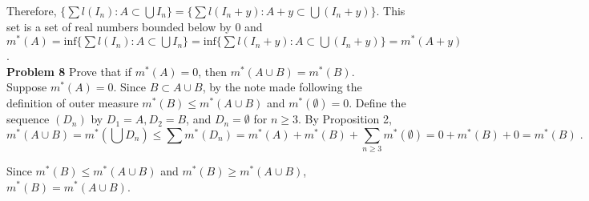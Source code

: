 \documentclass[a4paper]{article}
\begin{document}
Therefore, $\{\sum l(I_n) : A \subset \bigcup I_n \} = \{\sum l(I_n+y) : A +y\subset \bigcup (I_n+y) \}$. This set is a set of real numbers bounded below by 0 and $m^*(A) = \text{inf}\{\sum l(I_n) : A \subset \bigcup I_n \} = \text{inf}\{\sum l(I_n + y) : A \subset \bigcup (I_n+y) \} = m^*(A+y)$. \\

{\bf Problem 8} Prove that if $m^*(A) = 0$, then $m^*(A\cup B) = m^*(B)$.\\

Suppose $m^*(A) = 0$. Since $B \subset A\cup B$, by the note made following the definition of outer measure $m^*(B) \leq m^*(A\cup B)$ and $m^*(\emptyset) = 0$. Define the sequence $(D_n)$ by $D_1 = A, D_2 = B$, and $D_n = \emptyset$ for $n \geq 3$. By Proposition 2,  $$m^*(A\cup B) = m^*\left(\bigcup D_n\right) \leq \sum m^*(D_n) = m^*(A) + m^*(B) + \sum_{n\geq 3} m^*(\emptyset) = 0 + m^*(B) + 0 = m^*(B) \;.$$

Since $m^*(B) \leq m^*(A\cup B)$ and $m^*(B) \geq m^*(A\cup B)$, $m^*(B) = m^*(A\cup B)$.
\end{document}
